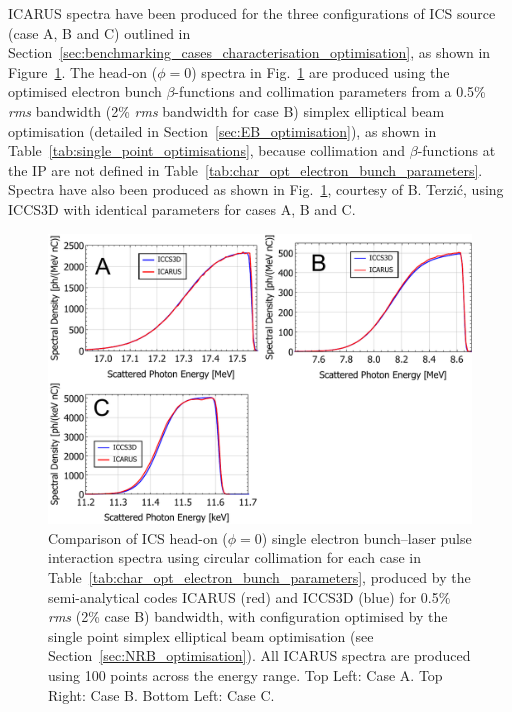 \documentclass[../main.tex]{subfiles}
\begin{document}
\textsc{ICARUS} spectra have been produced for the three configurations of ICS source (case A, B and C) outlined in Section~\ref{sec:benchmarking_cases_characterisation_optimisation}, as shown in Figure~\ref{fig:ICARUS_optimised_benchmarking}. The head-on ($\phi=0$) spectra in Fig.~\ref{fig:ICARUS_optimised_benchmarking} are produced using the optimised electron bunch $\beta$-functions and collimation parameters from a 0.5\% \textit{rms} bandwidth (2\% \textit{rms} bandwidth for case B) simplex elliptical beam optimisation (detailed in Section~\ref{sec:EB_optimisation}), as shown in Table~\ref{tab:single_point_optimisations}, because collimation and $\beta$-functions at the IP are not defined in Table~\ref{tab:char_opt_electron_bunch_parameters}. Spectra have also been produced as shown in Fig.~\ref{fig:ICARUS_optimised_benchmarking}, courtesy of B. Terzi\'{c}, using \textsc{ICCS3D} with identical parameters for cases A, B and C.       

\begin{figure}[!h]
\centering
\includegraphics[width=\textwidth]{Figures/Optimisation_and_Characterisation_of_Inverse_Compton_Scattering_Sources/ICARUS_ICCS3D_cases_comparision.pdf}
\caption{Comparison of ICS head-on ($\phi=0$) single electron bunch--laser pulse interaction spectra using circular collimation for each case in Table~\ref{tab:char_opt_electron_bunch_parameters}, produced by the semi-analytical codes \textsc{ICARUS} (red) and \textsc{ICCS3D} (blue) for 0.5\% \textit{rms} (2\% case B) bandwidth, with configuration optimised by the single point simplex elliptical beam optimisation  (see Section~\ref{sec:NRB_optimisation}). All \textsc{ICARUS} spectra are produced using 100 points across the energy range. Top Left: Case A. Top Right: Case B. Bottom Left: Case C.}
\label{fig:ICARUS_optimised_benchmarking}
\end{figure}
\end{document}
